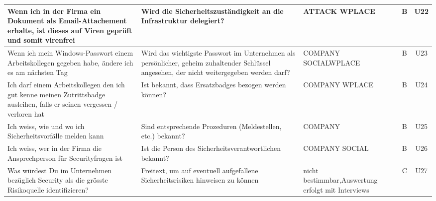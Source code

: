 \documentclass[../../main.tex]{subfiles}
\begin{document}
\begin{table}[H]
\begin{tabular}{ |p{5.5cm}|p{5.5cm}|p{2.5cm}|c|c|}
Wenn ich in der Firma ein Dokument als Email-Attachement erhalte, ist dieses auf Viren geprüft und somit virenfrei & Wird die Sicherheitszuständigkeit an die Infrastruktur delegiert? & ATTACK \newline WPLACE & B & U22 \\
\hline

Wenn ich mein Windows-Passwort einem Arbeitskollegen gegeben habe, ändere ich es am nächsten Tag & Wird das wichtigste Passwort im Unternehmen als persönlicher, geheim zuhaltender Schlüssel angesehen, der nicht weitergegeben werden darf? & COMPANY \newline SOCIAL\newline WPLACE & B & U23 \\
\hline

Ich darf einem Arbeitskollegen den ich gut kenne meinen Zutrittsbadge ausleihen, falls er seinen vergessen / verloren hat & Ist bekannt, dass Ersatzbadges bezogen werden können? & COMPANY \newline WPLACE & B & U24 \\
\hline

Ich weiss, wie und wo ich Sicherheitsvorfälle melden kann & Sind entsprechende Prozeduren (Meldestellen, etc.) bekannt? & COMPANY & B & U25 \\
\hline

Ich weiss, wer in der Firma die Ansprechperson für Securityfragen ist & Ist die Person des Sicherheitsverantwortlichen bekannt? & COMPANY \newline SOCIAL & B & U26 \\
\hline

Was würdest Du im Unternehmen bezüglich Security als die grösste Risikoquelle identifizieren? & Freitext, um auf eventuell aufgefallene Sicherheitsrisiken hinweisen zu können & nicht bestimmbar,\newline Auswertung erfolgt mit Interviews & C & U27 \\
\hline

\end{tabular}
\end{table}
\end{document}
